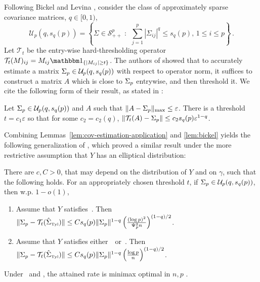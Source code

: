 \documentclass[times,sort&compress,3p]{elsarticle}
\newcommand{\Revision}[1]{{#1}}
\begin{document}
Following Bickel and Levina \cite{bickel2008covariance}, consider the class of approximately sparse covariance matrices, $q\in [0,1)$,
\begin{equation}
    \label{eq:sparse-cov-family}
    \mathcal{U}_p(q,s_q(p)) = \left\{ \Sigma\in \mathcal{S}_{++}^{p}\;:\;\,\sum_{j=1}^p |\Sigma_{ij}|^q \le s_q(p),\,1\le i\le p \right\}     \,.
\end{equation}
Let $\mathcal{T}_t$ be the entry-wise hard-thresholding operator $\mathcal{T}_t(M)_{ij} = M_{ij}\indic{|M_{ij}|\ge t}$. 
The authors of \cite{bickel2008covariance} showed that to accurately estimate a matrix $\Sigma_p\in \mathcal{U}_p(q,s_q(p))$ with respect to operator norm, it suffices to construct a matrix $A$ which is close to $\Sigma_p$ entrywise, and then threshold it. We cite the following form of their result, as stated in \cite[Lemma 6]{goes2017robust}:

\begin{lemma}\label{lem:bickel}
    Let $\Sigma_p\in \mathcal{U}_p(q,s_q(p))$ and $A$ such that $\|A-\Sigma_p\|_{\max}\le \varepsilon$. There is a threshold $t=c_1\varepsilon$ so that for some $c_2=c_2(q)$, $\|\mathcal{T}_t(A)-\Sigma_p\|\le c_2s_q(p)\varepsilon^{1-q}$.
\end{lemma}
Combining Lemmas~\ref{lem:cov-estimation-application} and \ref{lem:bickel} yields the following generalization of \cite[Theorem 1]{goes2017robust}, \Revision{which proved a similar result under the more restrictive assumption that $Y$ has an elliptical distribution:}
\begin{corollary}
    There are $c,C>0$, that may depend on the distribution of $Y$ and on $\gamma$, such that the following holds. For an appropriately chosen threshold $t$, 
    if $\Sigma_p\in \mathcal{U}_p(q,s_q(p))$, then w.p. $1-o(1)$,
    \begin{enumerate}
        \item 
        Assume that $Y$ satisfies~\AssumLC. Then
        $\|\Sigma_p-\mathcal{T}_t(\hat{\Sigma}_{\mbox{\tiny{Tyl}}})\| \le Cs_q(p)\|\Sigma_p\|^{1-q}\left( \frac{(\log p)^2}{\Psi_p^2 n} \right)^{(1-q)/2}$. 
        \item 
        Assume that $Y$ satisfies either~\AssumIndep~or~\AssumCCPSB. Then
        $\|\Sigma_p-\mathcal{T}_t(\hat{\Sigma}_{\mbox{\tiny{Tyl}}})\| \le Cs_q(p)\|\Sigma_p\|^{1-q}\left( {\frac{\log p}{n}} \right)^{(1-q)/2}$.
    \end{enumerate}
\end{corollary}
Under \AssumIndep~and \AssumCCPSB, the attained rate is minimax optimal in $n,p$ \cite{cai2012optimal}.
\end{document}
